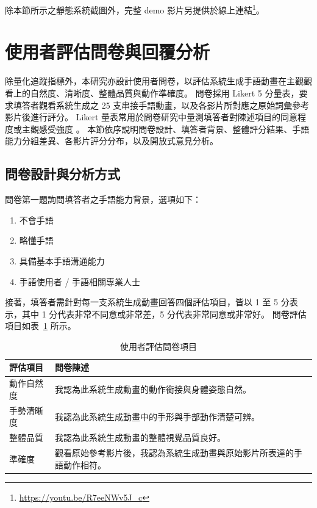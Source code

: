 \documentclass[class=NCU_thesis, crop=false]{standalone}
\begin{document}
除本節所示之靜態系統截圖外，完整 demo 影片另提供於線上連結\footnote{\url{https://youtu.be/R7eeNWv5J_c}}。

\section{使用者評估問卷與回覆分析}
\label{sec:exp_questionnaire}

除量化追蹤指標外，本研究亦設計使用者問卷，以評估系統生成手語動畫在主觀觀看上的自然度、清晰度、整體品質與動作準確度。
問卷採用 Likert 5 分量表，要求填答者觀看系統生成之 25 支串接手語動畫，以及各影片所對應之原始詞彙參考影片後進行評分。
Likert 量表常用於問卷研究中量測填答者對陳述項目的同意程度或主觀感受強度 \cite{likert1932technique}。
本節依序說明問卷設計、填答者背景、整體評分結果、手語能力分組差異、各影片評分分布，以及開放式意見分析。

\subsection{問卷設計與分析方式}

問卷第一題詢問填答者之手語能力背景，選項如下：

\begin{enumerate}
    \item 不會手語
    \item 略懂手語
    \item 具備基本手語溝通能力
    \item 手語使用者 / 手語相關專業人士
\end{enumerate}

接著，填答者需針對每一支系統生成動畫回答四個評估項目，皆以 1 至 5 分表示，其中 1 分代表非常不同意或非常差，5 分代表非常同意或非常好。
問卷評估項目如表~\ref{tab:questionnaire_items} 所示。

\begin{table}[H]
\centering
\caption{使用者評估問卷項目}
\label{tab:questionnaire_items}
\begin{tabular}{p{}p{}}
\toprule
評估項目 & 問卷陳述 \\
\midrule
動作自然度 & 我認為此系統生成動畫的動作銜接與身體姿態自然。 \\
手勢清晰度 & 我認為此系統生成動畫中的手形與手部動作清楚可辨。 \\
整體品質 & 我認為此系統生成動畫的整體視覺品質良好。 \\
準確度 & 觀看原始參考影片後，我認為系統生成動畫與原始影片所表達的手語動作相符。 \\
\bottomrule
\end{tabular}
\end{table}
\end{document}
